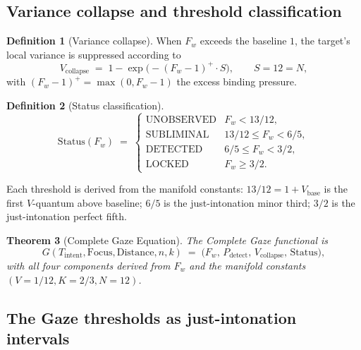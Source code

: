 \documentclass[11pt,a4paper]{article}
\newtheorem{theorem}{Theorem}[section]
\theoremstyle{definition}
\newtheorem{definition}[theorem]{Definition}
\theoremstyle{remark}
\begin{document}
\subsection{Variance collapse and threshold classification}

\begin{definition}[Variance collapse]\label{def:v-collapse}
When $F_{w}$ exceeds the baseline $1$, the target's local variance is suppressed according to
\[
V_{\mathrm{collapse}} \;=\; 1 - \exp\!\bigl(-(F_{w}-1)^{+}\cdot S\bigr), \qquad S=12 = N,
\]
with $(F_{w}-1)^{+} = \max(0, F_{w}-1)$ the excess binding pressure.
\end{definition}

\begin{definition}[Status classification]\label{def:status}
\[
\mathrm{Status}(F_{w}) \;=\; \begin{cases}\text{UNOBSERVED} & F_{w} < 13/12,\\ \text{SUBLIMINAL} & 13/12 \le F_{w} < 6/5,\\ \text{DETECTED} & 6/5 \le F_{w} < 3/2,\\ \text{LOCKED} & F_{w} \ge 3/2.\end{cases}
\]
\end{definition}

Each threshold is derived from the manifold constants: $13/12 = 1 + V_{\mathrm{base}}$ is the first $V$-quantum above baseline; $6/5$ is the just-intonation minor third; $3/2$ is the just-intonation perfect fifth.

\begin{theorem}[Complete Gaze Equation]\label{thm:complete-gaze}
The Complete Gaze functional is
\[
G(T_{\mathrm{intent}}, \mathrm{Focus}, \mathrm{Distance}, n, k) \;=\; \bigl(F_{w},\, P_{\mathrm{detect}},\, V_{\mathrm{collapse}},\, \mathrm{Status}\bigr),
\]
with all four components derived from $F_{w}$ and the manifold constants $(V=1/12, K=2/3, N=12)$.
\end{theorem}

\subsection{The Gaze thresholds as just-intonation intervals}
\end{document}

